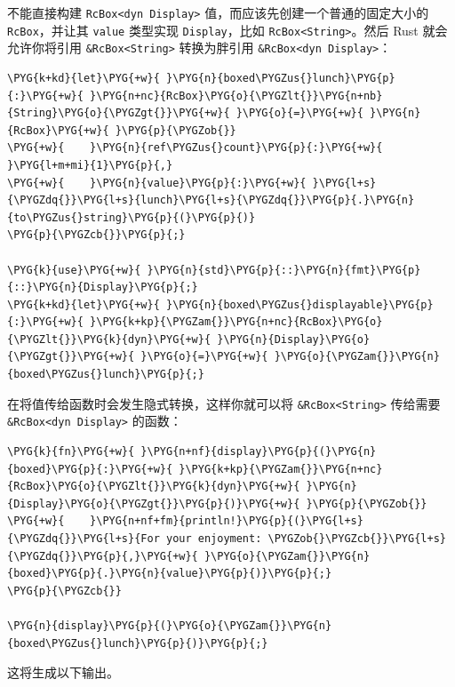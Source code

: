 不能直接构建 \texttt{RcBox<dyn Display>} 值，而应该先创建一个普通的固定大小的 \texttt{RcBox}，并让其 \texttt{value} 类型实现 \texttt{Display}，比如 \texttt{RcBox<String>}。然后 Rust 就会允许你将引用 \texttt{\&RcBox<String>} 转换为胖引用 \texttt{\&RcBox<dyn Display>}：

\begin{Verbatim}[commandchars=\\\{\},breaklines=true,breakanywhere=true,fontsize=\codefont,xleftmargin=17bp]
\PYG{k+kd}{let}\PYG{+w}{ }\PYG{n}{boxed\PYGZus{}lunch}\PYG{p}{:}\PYG{+w}{ }\PYG{n+nc}{RcBox}\PYG{o}{\PYGZlt{}}\PYG{n+nb}{String}\PYG{o}{\PYGZgt{}}\PYG{+w}{ }\PYG{o}{=}\PYG{+w}{ }\PYG{n}{RcBox}\PYG{+w}{ }\PYG{p}{\PYGZob{}}
\PYG{+w}{    }\PYG{n}{ref\PYGZus{}count}\PYG{p}{:}\PYG{+w}{ }\PYG{l+m+mi}{1}\PYG{p}{,}
\PYG{+w}{    }\PYG{n}{value}\PYG{p}{:}\PYG{+w}{ }\PYG{l+s}{\PYGZdq{}}\PYG{l+s}{lunch}\PYG{l+s}{\PYGZdq{}}\PYG{p}{.}\PYG{n}{to\PYGZus{}string}\PYG{p}{(}\PYG{p}{)}
\PYG{p}{\PYGZcb{}}\PYG{p}{;}

\PYG{k}{use}\PYG{+w}{ }\PYG{n}{std}\PYG{p}{::}\PYG{n}{fmt}\PYG{p}{::}\PYG{n}{Display}\PYG{p}{;}
\PYG{k+kd}{let}\PYG{+w}{ }\PYG{n}{boxed\PYGZus{}displayable}\PYG{p}{:}\PYG{+w}{ }\PYG{k+kp}{\PYGZam{}}\PYG{n+nc}{RcBox}\PYG{o}{\PYGZlt{}}\PYG{k}{dyn}\PYG{+w}{ }\PYG{n}{Display}\PYG{o}{\PYGZgt{}}\PYG{+w}{ }\PYG{o}{=}\PYG{+w}{ }\PYG{o}{\PYGZam{}}\PYG{n}{boxed\PYGZus{}lunch}\PYG{p}{;}
\end{Verbatim}

在将值传给函数时会发生隐式转换，这样你就可以将 \texttt{\&RcBox<String>} 传给需要 \texttt{\&RcBox<dyn Display>} 的函数：

\begin{Verbatim}[commandchars=\\\{\},breaklines=true,breakanywhere=true,fontsize=\codefont,xleftmargin=17bp]
\PYG{k}{fn}\PYG{+w}{ }\PYG{n+nf}{display}\PYG{p}{(}\PYG{n}{boxed}\PYG{p}{:}\PYG{+w}{ }\PYG{k+kp}{\PYGZam{}}\PYG{n+nc}{RcBox}\PYG{o}{\PYGZlt{}}\PYG{k}{dyn}\PYG{+w}{ }\PYG{n}{Display}\PYG{o}{\PYGZgt{}}\PYG{p}{)}\PYG{+w}{ }\PYG{p}{\PYGZob{}}
\PYG{+w}{    }\PYG{n+nf+fm}{println!}\PYG{p}{(}\PYG{l+s}{\PYGZdq{}}\PYG{l+s}{For your enjoyment: \PYGZob{}\PYGZcb{}}\PYG{l+s}{\PYGZdq{}}\PYG{p}{,}\PYG{+w}{ }\PYG{o}{\PYGZam{}}\PYG{n}{boxed}\PYG{p}{.}\PYG{n}{value}\PYG{p}{)}\PYG{p}{;}
\PYG{p}{\PYGZcb{}}

\PYG{n}{display}\PYG{p}{(}\PYG{o}{\PYGZam{}}\PYG{n}{boxed\PYGZus{}lunch}\PYG{p}{)}\PYG{p}{;}
\end{Verbatim}

这将生成以下输出。


